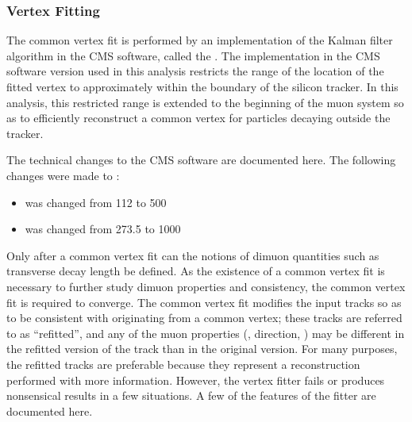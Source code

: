 \subsubsection{Vertex Fitting}
\label{sec:dd:vertexfitting}
The common vertex fit is performed by an implementation of the Kalman filter algorithm in the CMS software, called the .
The implementation in the CMS software version used in this analysis restricts the range of the location of the fitted vertex to approximately within the boundary of the silicon tracker.
In this analysis, this restricted range is extended to the beginning of the muon system so as to efficiently reconstruct a common vertex for particles decaying outside the tracker.

The technical changes to the CMS software are documented here.
The following changes were made to :
\begin{itemize}
  \item {} was changed from 112 to 500
  \item {} was changed from 273.5 to 1000
\end{itemize}

Only after a common vertex fit can the notions of dimuon quantities such as transverse decay length be defined.
As the existence of a common vertex fit is necessary to further study dimuon properties and consistency, the common vertex fit is required to converge.
The common vertex fit modifies the input tracks so as to be consistent with originating from a common vertex; these tracks are referred to as ``refitted'', and any of the muon properties (\pT, direction, \etc) may be different in the refitted version of the track than in the original version.
For many purposes, the refitted tracks are preferable because they represent a reconstruction performed with more information.
However, the vertex fitter fails or produces nonsensical results in a few situations.
A few of the features of the fitter are documented here.

